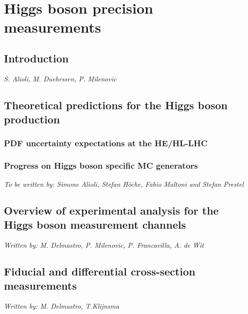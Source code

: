 \documentclass[../report.tex]{subfiles}
\providecommand{\main}{..}
\begin{document}
\section{Higgs boson precision measurements}

\subsection{Introduction}
\begin{center}{\it S. Alioli, M. Duehrssen, P. Milenovic} \end{center}
\label{sec:2:introduction}


\subsection{Theoretical predictions for the Higgs boson production}
\label{sec:2_HXSWG1}


\subsubsection{PDF uncertainty expectations at the HE/HL-LHC}
\label{sec:2:PDFuncertainties}


\subsubsection{Progress on Higgs boson specific MC generators}
\begin{center} {\it To be written by: Simone Alioli, Stefan H\"oche, Fabio Maltoni and Stefan Prestel} \end{center}


\subsection{Overview of experimental analysis for the Higgs boson measurement channels}
\begin{center}
  {\it Written by: M. Delmastro, P. Milenovic, P. Francavilla, A. de Wit}
\end{center}
\label{sec:2:channels}


\subsection{Fiducial and differential cross-section measurements}
\begin{center}
  {\it Written by: M. Delmastro, T.Klijnsma}
\end{center}
\label{sec:2:fiducial}

\end{document}
